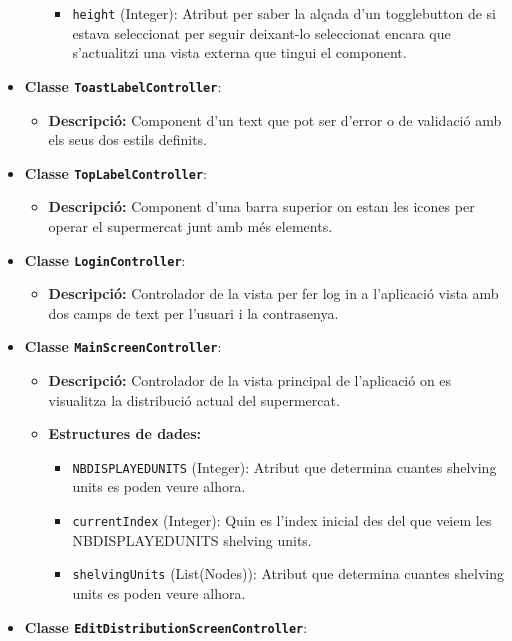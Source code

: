 \documentclass[a4paper,12pt]{report}
\begin{document}
\begin{itemize}
\begin{itemize}
\begin{itemize}
			\item \texttt{height} (Integer): Atribut per saber la alçada d'un togglebutton de si estava seleccionat per seguir deixant-lo seleccionat encara que s'actualitzi una vista externa que tingui el component.
		\end{itemize}
	\end{itemize}
	\item \textbf{Classe \texttt{ToastLabelController}}:
	\begin{itemize}
		\item \textbf{Descripció:} Component d'un text que pot ser d'error o de validació amb els seus dos estils definits.
	\end{itemize}
	\item \textbf{Classe \texttt{TopLabelController}}:
	\begin{itemize}
		\item \textbf{Descripció:} Component d'una barra superior on estan les icones per operar el supermercat junt amb més elements.
	\end{itemize}
	\item \textbf{Classe \texttt{LoginController}}:
	\begin{itemize}
		\item \textbf{Descripció:} Controlador de la vista per fer log in a l'aplicació vista amb dos camps de text per l'usuari i la contrasenya.
	\end{itemize}
	\item \textbf{Classe \texttt{MainScreenController}}:
	\begin{itemize}
		\item \textbf{Descripció:} Controlador de la vista principal de l'aplicació on es visualitza la distribució actual del supermercat.
		\item \textbf{Estructures de dades:}
		\begin{itemize}
			\item \texttt{NBDISPLAYEDUNITS} (Integer): Atribut que determina cuantes shelving units es poden veure alhora.
			\item \texttt{currentIndex} (Integer): Quin es l'index inicial des del que veiem les NBDISPLAYEDUNITS shelving units.
			\item \texttt{shelvingUnits} (List(Nodes)): Atribut que determina cuantes shelving units es poden veure alhora.
		\end{itemize}
	\end{itemize}
	\item \textbf{Classe \texttt{EditDistributionScreenController}}:

\end{itemize}
\end{document}
